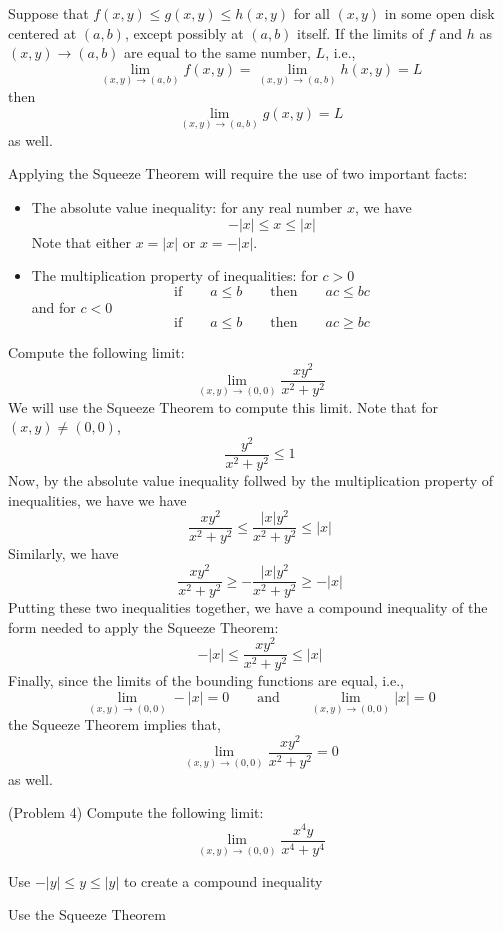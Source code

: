 \documentclass[handout]{ximera}
\begin{document}
\begin{theorem}
Suppose that $f(x,y) \leq g(x,y) \leq h(x,y)$ for all $(x,y)$ in some 
open disk centered at $(a,b)$, except possibly at $(a,b)$ itself.
If the limits of $f$ and $h$ as $(x,y) \to (a,b)$ are equal to the 
same number, $L$, i.e.,
\[
\lim_{(x,y) \to (a,b)} f(x,y) = \lim_{(x,y) \to (a,b)} h(x,y) = L  
\]
then
\[
\lim_{(x,y) \to (a,b)} g(x,y) = L
\]
as well.
\end{theorem}
Applying the Squeeze Theorem will require the use of two important facts:
\begin{itemize}
    \item The absolute value inequality: for any real number $x$, we have 
    \[-|x| \leq x \leq |x|\]
Note that either $x = |x|$ or $x = -|x|$.
    \item The multiplication property of inequalities:  for $c > 0$
    \[\text{if} \qquad a\leq b  \qquad \text{then} \qquad ac \leq bc\]
    and for $c < 0$
    \[\text{if} \qquad a\leq b  \qquad \text{then} \qquad ac \geq bc\]  
\end{itemize} 

\begin{example}[Example 4]
Compute the following limit:
\[
\lim_{(x,y) \to (0,0)} \frac{xy^2}{x^2 + y^2}
\]
We will use the Squeeze Theorem to compute this limit.
Note that for $(x,y) \neq (0,0)$,
\[\frac{y^2}{x^2+y^2} \leq 1\]
Now, by the absolute value inequality follwed by the multiplication property of inequalities, we have
we have
\[\frac{xy^2}{x^2 + y^2}\leq \frac{|x|y^2}{x^2 + y^2}\leq |x|\]
Similarly, we have
\[\frac{xy^2}{x^2 + y^2} \geq -\frac{|x|y^2}{x^2 + y^2} \geq -|x|\]
Putting these two inequalities together, we have a compound 
inequality of the form needed to apply the Squeeze Theorem:
\[
-|x| \leq \frac{xy^2}{x^2 + y^2} \leq |x|
\]
Finally, since the limits of the bounding functions are equal, i.e., 
\[
\lim_{(x,y) \to (0,0)} -|x| = 0  \qquad \text{and} \qquad 
\lim_{(x,y) \to (0,0)} |x| = 0
\]
the Squeeze Theorem implies that, 
\[
\lim_{(x,y) \to (0,0)} \frac{xy^2}{x^2 + y^2} =0
\]
as well.
\end{example}

\begin{problem}(Problem 4)
Compute the following limit:
\[
\lim_{(x,y) \to (0,0)} \frac{x^4y}{x^4 + y^4}
\]
\begin{hint}
Use $-|y| \leq y \leq |y|$ to create a compound inequality
\end{hint}
\begin{hint}
Use the Squeeze Theorem
\end{hint}
\end{problem}
\end{document}
